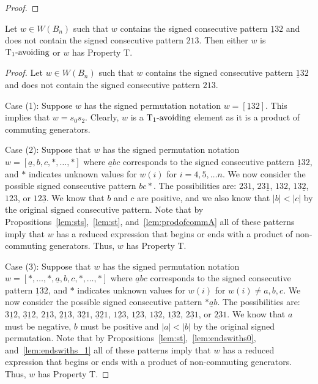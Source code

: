 \begin{proposition}
\begin{proof}
\end{proof}	
\end{proposition}

\begin{proposition}\label{lem:132}
Let $w \in W(B_n)$ such that $w$ contains the signed consecutive pattern $\underline{1}32$ and does not contain the signed consecutive pattern $213$. Then either $w$ is $\operatorname{T_1-\mathrm{avoiding}}$ or $w$ has Property T.
\begin{proof}
	Let $w \in W(B_n)$ such that $w$ contains the signed consecutive pattern $\underline{1}32$ and does not contain the signed consecutive pattern $213$.
	
	Case (1): Suppose $w$ has the signed permutation notation $w=[\underline{1}32]$. This implies that $w=s_0s_2$. Clearly, $w$ is a $\operatorname{T_1-\mathrm{avoiding}}$ element as it is a product of commuting generators.
	
	Case (2): Suppose that $w$ has the signed permutation notation $w=[\underline{a},b,c, \ast, \ldots, \ast]$ where $\underline{a}bc$ corresponds to the signed consecutive pattern $\underline{1}32$, and $\ast$ indicates unknown values for $w(i)$ for $i=4,5, \ldots n$. We now consider the possible signed consecutive pattern $bc \ast$. The possibilities are: $231$, $23 \underline{1}$, $13 2$, $13 \underline{2}$, $123$, or $12\underline{3}$. We know that $b$ and $c$ are positive, and we also know that $|b|<|c|$ by the original signed consecutive pattern. Note that by Propositions~\ref{lem:sts},~\ref{lem:st}, and~\ref{lem:prodofcommA} all of these patterns imply that $w$ has a reduced expression that begins or ends with a product of non-commuting generators. Thus, $w$ has Property T.
	
	Case (3): Suppose that $w$ has the signed permutation notation $w=[\ast, \ldots, \ast, \underline{a},b,c, \ast, \ldots, \ast]$ where $\underline{a}bc$ corresponds to the signed consecutive pattern $\underline{1}32$, and $\ast$ indicates unknown values for $w(i)$ for $w(i)\neq a,b,c$. We now consider the possible signed consecutive pattern $\ast \underline{a} b$. The possibilities are: $3 \underline{1} 2$, $\underline{3} \underline{1} 2$, $2 \underline{1} 3$, $\underline{2} \underline{1} 3$, $3 \underline{2} 1$, $\underline{3} \underline{2} 1$, $1 \underline{2} 3$, $\underline{12}3$, $1\underline{3}2$, $\underline{13}2$, $2\underline{3}1$, or $\underline{23}1$. We know that $a$ must be negative, $b$ must be positive and $|a|<|b|$ by the original signed permutation. Note that by Propositions~\ref{lem:st},~\ref{lem:endswiths0}, and~\ref{lem:endswiths_1} all of these patterns imply that $w$ has a reduced expression that begins or ends with a product of non-commuting generators. Thus, $w$ has Property T. 
	

\end{proof}
\end{proposition}
